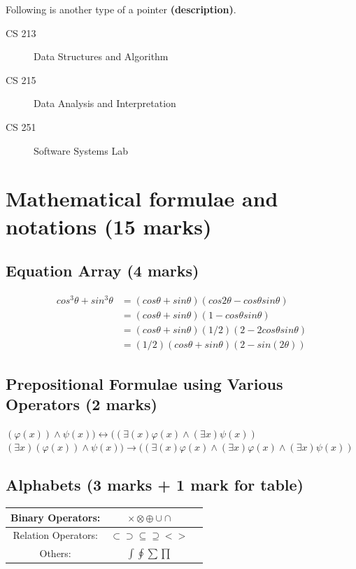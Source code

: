 \documentclass[12pt]{article}
\begin{document}
Following is another type of a pointer \textbf{(description)}.
\begin{description}
	\item[CS 213] Data Structures and Algorithm
	\item[CS 215] Data Analysis and Interpretation
	\item[CS 251] Software Systems Lab
\end{description}
\newpage
\section{Mathematical formulae and notations (15 marks)}
\subsection{Equation Array (4 marks)}
\begin{align}
cos^3\theta+sin^3\theta &=(cos\theta+sin\theta)(cos2\theta-cos\theta sin\theta)\label{eq1}\\
						&=(cos\theta+sin\theta)(1-cos\theta sin\theta)\\
						&=(cos\theta+sin\theta)(1/2)(2-2cos\theta sin\theta)\\
						&=(1/2)(cos\theta+sin\theta)(2-sin(2\theta))
\end{align}
\subsection{Prepositional Formulae using Various Operators (2 marks)}
$\displaystyle(\varphi(x))\wedge\psi(x))\longleftrightarrow((\exists(x)\varphi(x)\wedge(\exists x)\psi(x))$\\
$\displaystyle(\exists x)(\varphi(x))\wedge\psi(x))\longrightarrow((\exists(x)\varphi(x)\wedge(\exists x)\varphi(x)\wedge(\exists x)\psi(x))$
\subsection{Alphabets (3 marks + 1 mark for table)}
\begin{center}
\begin{tabular}{ |c|c|c| } 
 \hline
 Binary Operators: & $\times\otimes\oplus\cup\cap$ \\[2ex] 
 \hline
 Relation Operators: & $\subset\supset\subseteq\supseteq<>$ \\[2ex] 
 \hline
 Others: & $\int\oint\sum\prod$ \\[2ex]
 \hline
\end{tabular}
\end{center}
\end{document}
